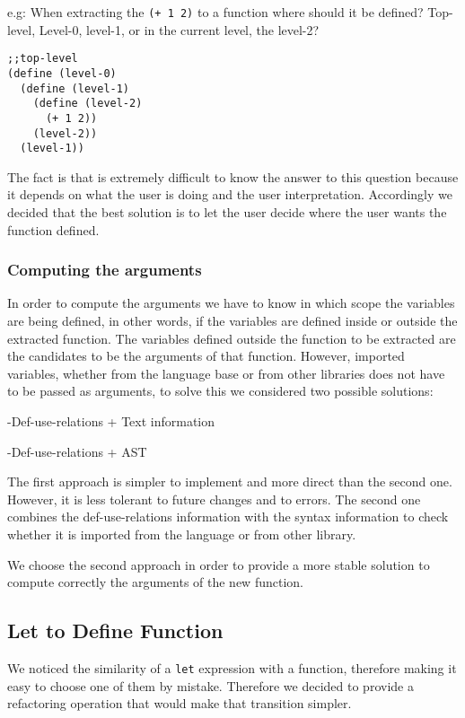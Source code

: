 e.g: When extracting the {\tt (+ 1 2)} to a function where should it be defined?
Top-level, Level-0, level-1, or in the current level, the level-2?
\begin{lstlisting}[basicstyle=\ttfamily, caption=Extract function levels]
;;top-level
(define (level-0)
  (define (level-1)
    (define (level-2)
      (+ 1 2))
    (level-2))
  (level-1))
\end{lstlisting}

The fact is that is extremely difficult to know the answer to this question because
it depends on what the user is doing and the user interpretation.
Accordingly we decided that the best solution is to let the user decide where
the user wants the function defined.


\subsubsection{Computing the arguments}

In order to compute the arguments we have to know in which scope the variables are being defined, in other words,
if the variables are defined inside or outside the extracted function. %
The variables defined outside the function to be extracted are the candidates to be the arguments %
of that function.
However, imported variables, whether from the language base or from other libraries
does not have to be passed as arguments, to solve this we considered two possible solutions:

  -Def-use-relations + Text information

  -Def-use-relations + AST

The first approach is simpler to implement and more direct than the second one.
However, it is less tolerant to future changes and to errors.
The second one combines the def-use-relations information with the syntax information to
check whether it is imported from the language or from other library.

We choose the second approach in order to provide a more stable solution to compute
 correctly the arguments of the new function.

\subsection{Let to Define Function} %

We noticed the similarity of a {\tt let} expression with a function, therefore making
it easy to choose one of them by mistake.
Therefore we decided to provide a refactoring operation that would make that transition simpler.

